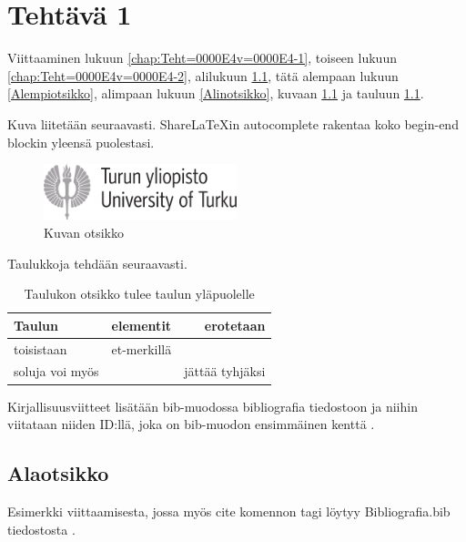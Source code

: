 
\chapter{Tehtävä 1 \label{chap:Teht=0000E4v=0000E4-1}}

Viittaaminen lukuun \ref{chap:Teht=0000E4v=0000E4-1}, toiseen lukuun
\ref{chap:Teht=0000E4v=0000E4-2}, alilukuun \ref{Alaotsikko}, tätä
alempaan lukuun \ref{Alempiotsikko}, alimpaan lukuun \ref{Alinotsikko},
kuvaan \ref{Kuva esimerkki} ja tauluun \ref{Tauluesimerkki}.

Kuva liitetään seuraavasti. ShareLaTeXin autocomplete rakentaa
koko begin-end blockin yleensä puolestasi.

\begin{figure}
\centering \includegraphics[width=0.5\textwidth]{kuvat/turun-yliopisto}
\caption{Kuvan otsikko}
\label{Kuva esimerkki} 
\end{figure}

Taulukkoja tehdään seuraavasti.

\begin{table}
\begin{centering}
\caption{Taulukon otsikko tulee taulun yläpuolelle}
\begin{tabular}{l|c|r|}
Taulun  & elementit  & erotetaan \tabularnewline
\hline 
toisistaan  & et-merkillä  & \tabularnewline
soluja voi myös  &  & jättää tyhjäksi \tabularnewline
\end{tabular}
\par\end{centering}
\centering{}\label{Tauluesimerkki}
\end{table}

Kirjallisuusviitteet lisätään bib-muodossa bibliografia
tiedostoon ja niihin viitataan niiden ID:llä, joka on bib-muodon
ensimmäinen kenttä \cite{crawley2007write}.

\section{Alaotsikko}

\label{Alaotsikko}

Esimerkki viittaamisesta, jossa myös cite komennon tagi löytyy
Bibliografia.bib tiedostosta \cite{puasuareanu2009survey}.

